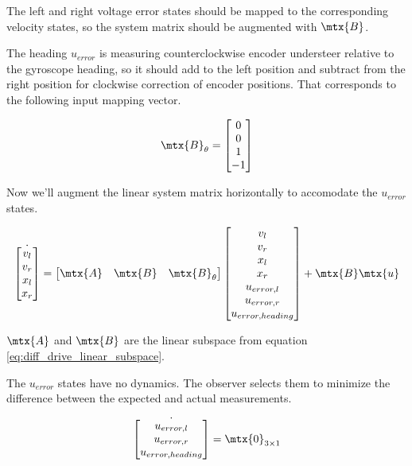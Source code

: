The left and right voltage error states should be mapped to the corresponding
velocity states, so the system matrix should be augmented with $\mtx{B}$.

The heading $u_{error}$ is measuring counterclockwise encoder understeer
relative to the gyroscope heading, so it should add to the left position and
subtract from the right position for clockwise correction of encoder positions.
That corresponds to the following input mapping vector.

\begin{equation*}
  \mtx{B}_{\theta} = \begin{bmatrix}
    0 \\
    0 \\
    1 \\
    -1
  \end{bmatrix}
\end{equation*}

Now we'll augment the linear system matrix horizontally to accomodate the
$u_{error}$ states.

\begin{equation}
  \dot{\begin{bmatrix}
    v_l \\
    v_r \\
    x_l \\
    x_r
  \end{bmatrix}} =
    \begin{bmatrix}
      \mtx{A} & \mtx{B} & \mtx{B}_{\theta}
    \end{bmatrix}
    \begin{bmatrix}
      v_l \\
      v_r \\
      x_l \\
      x_r \\
      u_{error,l} \\
      u_{error,r} \\
      u_{error,heading}
    \end{bmatrix} + \mtx{B}\mtx{u}
\end{equation}

$\mtx{A}$ and $\mtx{B}$ are the linear subspace from equation
\eqref{eq:diff_drive_linear_subspace}.

The $u_{error}$ states have no dynamics. The observer selects them to minimize
the difference between the expected and actual measurements.

\begin{equation}
  \dot{\begin{bmatrix}
    u_{error,l} \\
    u_{error,r} \\
    u_{error,heading}
  \end{bmatrix}} = \mtx{0}_{3 \times 1}
\end{equation}

